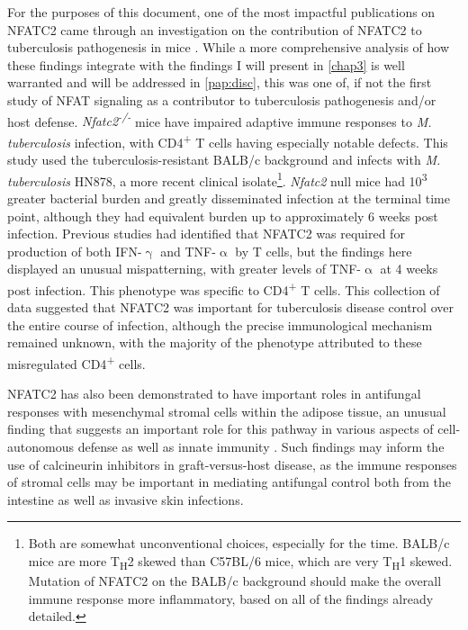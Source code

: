 For the purposes of this document, one of the most impactful publications on NFATC2 came through an investigation on the contribution of NFATC2 to tuberculosis pathogenesis in mice \citep{Via2012}. While a more comprehensive analysis of how these findings integrate with the findings I will present in \autoref{chap3} is well warranted and will be addressed in \autoref{pap:disc}, this was one of, if not the first study of NFAT signaling as a contributor to tuberculosis pathogenesis and/or host defense. \textit{Nfatc2\textsuperscript{\hyp{}/\hyp{}}} mice have impaired adaptive immune responses to \textit{M. tuberculosis} infection, with CD4\textsuperscript{+} T cells having especially notable defects. This study used the tuberculosis\hyp{}resistant BALB/c background and infects with \textit{M. tuberculosis} HN878, a more recent clinical isolate\footnote{Both are somewhat unconventional choices, especially for the time. BALB/c mice are more T\textsubscript{H}2 skewed than C57BL/6 mice, which are very T\textsubscript{H}1 skewed. Mutation of NFATC2 on the BALB/c background should make the overall immune response more inflammatory, based on all of the findings already detailed.}. \textit{Nfatc2} null mice had 10\textsuperscript{3} greater bacterial burden and greatly disseminated infection at the terminal time point, although they had equivalent burden up to approximately 6 weeks post infection. Previous studies had identified that NFATC2 was required for production of both IFN\hyp{}$\upgamma$ and TNF\hyp{}$\upalpha$ by T cells, but the findings here displayed an unusual mispatterning, with greater levels of TNF\hyp{}$\upalpha$ at 4 weeks post infection. This phenotype was specific to CD4\textsuperscript{+} T cells. This collection of data suggested that NFATC2 was important for tuberculosis disease control over the entire course of infection, although the precise immunological mechanism remained unknown, with the majority of the phenotype attributed to these misregulated CD4\textsuperscript{+} cells. 

NFATC2 has also been demonstrated to have important roles in antifungal responses with mesenchymal stromal cells within the adipose tissue, an unusual finding that suggests an important role for this pathway in various aspects of cell-autonomous defense as well as innate immunity \citep{Tidu2021}. Such findings may inform the use of calcineurin inhibitors in graft-versus-host disease, as the immune responses of stromal cells may be important in mediating antifungal control both from the intestine as well as invasive skin infections. 

